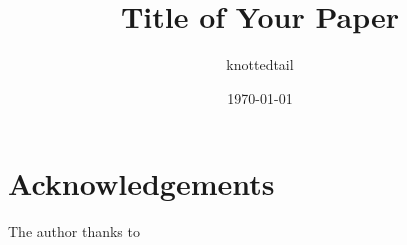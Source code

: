 \documentclass[11pt]{amsart}
\title{Title of Your Paper}
\author{knottedtail}
\date{\today}
\begin{document}
\begin{abstract}

\end{abstract}

\maketitle



\section*{Acknowledgements}
The author thanks to 



\end{document}
